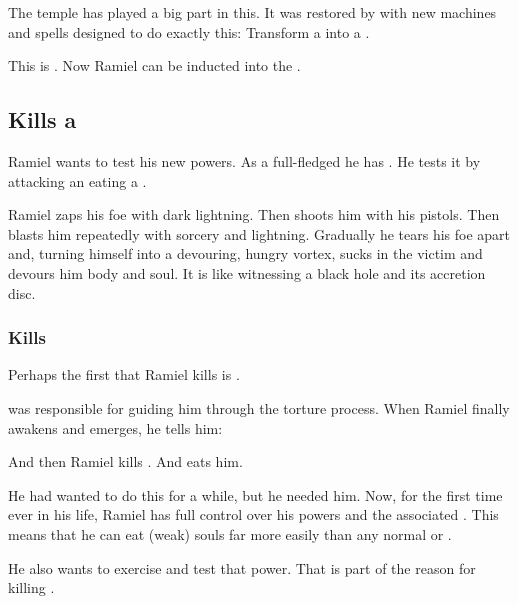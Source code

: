 The temple has played a big part in this.
It was restored by \Azraid with new machines and spells designed to do exactly this:
Transform a \malach into a \neoresphan. 

This is . 
Now Ramiel can be inducted into the . 










\subsection{Kills a \resphan}
Ramiel wants to test his new powers. 
As a full-fledged \malach he has . 
He tests it by attacking an eating a \resphan. 

Ramiel zaps his foe with dark lightning. 
Then shoots him with his pistols.
Then blasts him repeatedly with sorcery and lightning.
Gradually he tears his foe apart and, turning himself into a devouring, hungry vortex, sucks in the victim and devours him body and soul.
It is like witnessing a black hole and its accretion disc.





\subsubsection{Kills \Gilchad}
Perhaps the first \resphan that Ramiel kills is \Gilchad. 

\Gilchad{} was responsible for guiding him through the torture process. 
When Ramiel finally awakens and emerges, he tells him: 

And then Ramiel kills \Gilchad. 
And eats him. 

He had wanted to do this for a while, but he needed him. 
Now, for the first time ever in his life, Ramiel has full control over his \Malach{} powers and the associated \carcer. 
This means that he can eat (weak) souls far more easily than any normal \resphan{} or \dragon. 

He also wants to exercise and test that power. 
That is part of the reason for killing \Gilchad. 















